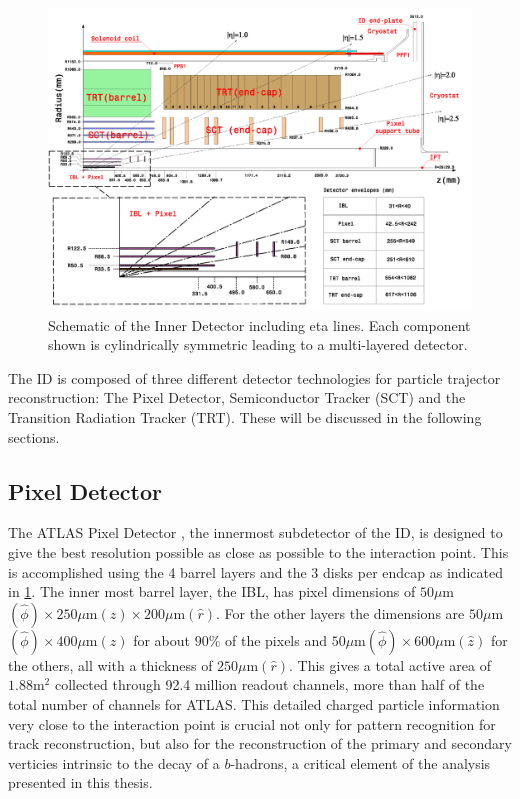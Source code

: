 \begin{figure}[!htbp]
  \begin{center}
    \includegraphics[width=0.8\linewidth]{figures/atlas/inner_detector_schematic}
    \caption{ \cite{PIX-2018-001} Schematic of the Inner Detector including eta
lines.  Each component shown is cylindrically symmetric leading to a
multi-layered detector.}
    \label{fig:inner_detector_schematic}
  \end{center}
\end{figure}

The ID is composed of three different detector technologies for particle
trajector reconstruction: The Pixel Detector, Semiconductor Tracker (SCT) and
the Transition Radiation Tracker (TRT).  These will be discussed in the
following sections. 

\subsection{Pixel Detector}

The ATLAS Pixel Detector \cite{PERF-2007-01}, the innermost subdetector of the ID, is designed to
give the best resolution possible as close as possible to the interaction point.
This is accomplished using the 4 barrel layers and the 3 disks per endcap as
indicated in \cref{fig:inner_detector_schematic}. The inner most barrel
layer, the IBL, has pixel dimensions of $50\mu $m$(\hat{\phi}) \times 250\mu $m$
(\hat{z}) \times 200\mu $m$(\hat{r})$.  For the other layers the dimensions are
$50\mu $m$(\hat{\phi}) \times 400\mu $m$(\hat{z})$ for about $90\%$ of the pixels
and $50\mu $m$(\hat{\phi}) \times 600\mu $m$(\hat{z})$ for the others, all with a
thickness of $250\mu $m$(\hat{r})$.  This gives a total active area of $1.88 $m$^2$
collected through 92.4 million readout channels, more than half of the total
number of channels for ATLAS. This detailed charged particle information very
close to the interaction point is crucial not only for pattern recognition for
track reconstruction, but also for the reconstruction of the primary and
secondary verticies intrinsic to the decay of a $b$-hadrons, a critical element
of the analysis presented in this thesis.

